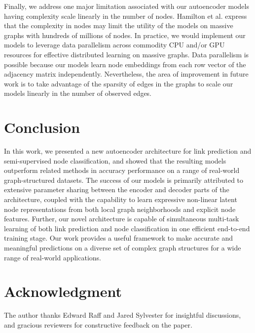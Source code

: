 \documentclass[letterpaper, conference]{IEEEtran}
\begin{document}
Finally, we address one major limitation associated with our autoencoder models having complexity scale linearly in the number of nodes. Hamilton et al. \cite{Hamilton:2017} express that the complexity in nodes may limit the utility of the models on massive graphs with hundreds of millions of nodes. In practice, we would implement our models to leverage data parallelism \cite{Shrivastava:2017} across commodity CPU and/or GPU resources for effective distributed learning on massive graphs. Data parallelism is possible because our models learn node embeddings from each row vector of the adjacency matrix independently. Nevertheless, the area of improvement in future work is to take advantage of the sparsity of edges in the graphs to scale our models linearly in the number of observed edges.

\section{Conclusion}
In this work, we presented a new autoencoder architecture for link prediction and semi-supervised node classification, and showed that the resulting models outperform related methods in accuracy performance on a range of real-world graph-structured datasets. The success of our models is primarily attributed to extensive parameter sharing between the encoder and decoder parts of the architecture, coupled with the capability to learn expressive non-linear latent node representations from both local graph neighborhoods and explicit node features. Further, our novel architecture is capable of simultaneous multi-task learning of both link prediction and node classification in one efficient end-to-end training stage. Our work provides a useful framework to make accurate and meaningful predictions on a diverse set of complex graph structures for a wide range of real-world applications.

\section*{Acknowledgment}
The author thanks Edward Raff and Jared Sylvester for insightful discussions, and gracious reviewers for constructive feedback on the paper.
\end{document}
